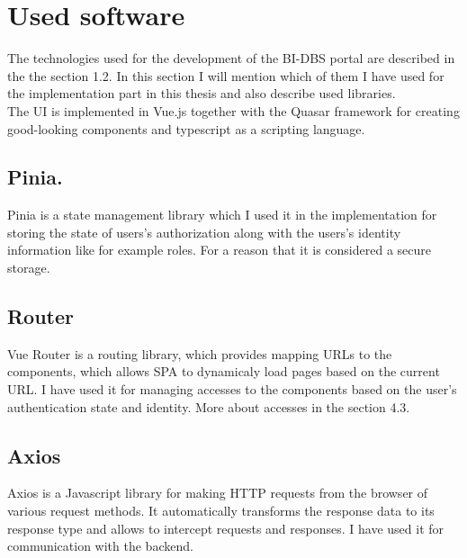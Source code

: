 \section{Used software} The technologies used for the development of the BI-DBS portal are described in the the section 1.2. In this section I will mention which of them I have used for the implementation part in this thesis and also describe used libraries.\\
The UI is implemented in Vue.js together with the Quasar framework for creating good-looking components and typescript as a scripting language. 

\subsection{Pinia.} Pinia is a state management library which I used it in the implementation for storing the state of users's authorization along with the users's identity information like for example roles. For a reason that it is considered a secure storage.

\subsection{Router} Vue Router is a routing library, which provides mapping URLs to the components, which allows SPA to dynamicaly load pages based on the current URL. I have used it for managing accesses to the components based on the user's authentication state and identity. More about accesses in the section 4.3.

\subsection{Axios} Axios is a Javascript library for making HTTP requests from the browser of various request methods. It automatically transforms the response data to its response type and allows to intercept requests and responses. I have used it for communication with the backend.
